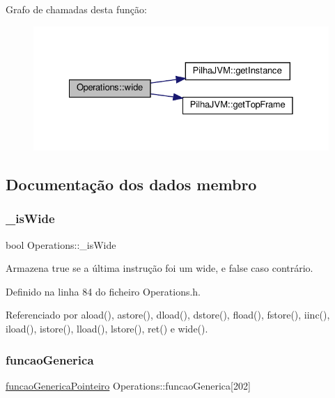 Grafo de chamadas desta função\+:
\nopagebreak
\begin{figure}[H]
\begin{center}
\leavevmode
\includegraphics[width=328pt]{classOperations_ab1474dfc4eb5142361b00d185f0a4a2b_cgraph}
\end{center}
\end{figure}


\subsection{Documentação dos dados membro}
\mbox{\label{classOperations_ab20aea5d0327c8100d12b217ecbbd62c}} 
\subsubsection{\texorpdfstring{\+\_\+is\+Wide}{\_isWide}}
{\footnotesize\ttfamily bool Operations\+::\+\_\+is\+Wide\hspace{0.3cm}{\ttfamily [private]}}

Armazena {\ttfamily true} se a última instrução foi um wide, e {\ttfamily false} caso contrário. 

Definido na linha 84 do ficheiro Operations.\+h.



Referenciado por aload(), astore(), dload(), dstore(), fload(), fstore(), iinc(), iload(), istore(), lload(), lstore(), ret() e wide().

\mbox{\label{classOperations_a5576f742afb9d43d3ea33f2ddd33fd43}} 
\subsubsection{\texorpdfstring{funcao\+Generica}{funcaoGenerica}}
{\footnotesize\ttfamily \hyperlink{Operations_8h_a40aa26aea6df6f70ca74e7547328d316}{funcao\+Generica\+Pointeiro} Operations\+::funcao\+Generica\mbox{[}202\mbox{]}\hspace{0.3cm}{\ttfamily [private]}}


